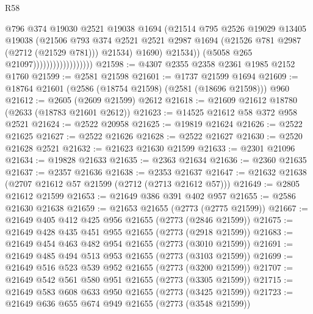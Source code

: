 \begin{lexlean}{R58}
\begin{coremodule}
                                          @796
                                          @374
                                          @19030
                                          @2521
                                          @19038
                                          @1694
                                          (@21514
                                            @795
                                            @2526
                                            @19029
                                            @13405
                                            @19038
                                            (@21506
                                              @793
                                              @374
                                              @2521
                                              @2521
                                              @2987
                                              @1694
                                              (@21526 @781 @2987 (@2712 (@21529 @781)))
                                              @21534)
                                            @1690)
                                          @21534))
                                      (@5058 @265 @21097))))))))))))))))))
@21598 := @4307 @2355 @2358 @2361 @1985 @2152 @1760
@21599 := @2581 @21598
@21601 := @1737 @21599 @1694
@21609 := @18764 @21601 (@2586 (@18754 @21598) (@2581 (@18696 @21598))) @960
@21612 := @2605 (@2609 @21599) @2612
@21618 := @21609 @21612 @18780 (@2633 (@18783 @21601 @2612))
@21623 := @14525 @21612 @58 @372 @958 @2521
@21624 := @2522 @20958
@21625 := @19819 @21624
@21626 := @2522 @21625
@21627 := @2522 @21626
@21628 := @2522 @21627
@21630 := @2520 @21628 @2521
@21632 := @21623 @21630 @21599
@21633 := @2301 @21096
@21634 := @19828 @21633
@21635 := @2363 @21634
@21636 := @2360 @21635
@21637 := @2357 @21636
@21638 := @2353 @21637
@21647 := @21632 @21638 (@2707 @21612 @57 @21599 (@2712 (@2713 @21612 @57)))
@21649 := @2805 @21612 @21599
@21653 := @21649 @386 @391 @402 @957
@21655 := @2586 @21630 @21638
@21659 := @21653 @21655 (@2773 (@2775 @21599))
@21667 := @21649 @405 @412 @425 @956 @21655 (@2773 (@2846 @21599))
@21675 := @21649 @428 @435 @451 @955 @21655 (@2773 (@2918 @21599))
@21683 := @21649 @454 @463 @482 @954 @21655 (@2773 (@3010 @21599))
@21691 := @21649 @485 @494 @513 @953 @21655 (@2773 (@3103 @21599))
@21699 := @21649 @516 @523 @539 @952 @21655 (@2773 (@3200 @21599))
@21707 := @21649 @542 @561 @580 @951 @21655 (@2773 (@3305 @21599))
@21715 := @21649 @583 @608 @633 @950 @21655 (@2773 (@3425 @21599))
@21723 := @21649 @636 @655 @674 @949 @21655 (@2773 (@3548 @21599))

\end{coremodule}
\end{lexlean}
